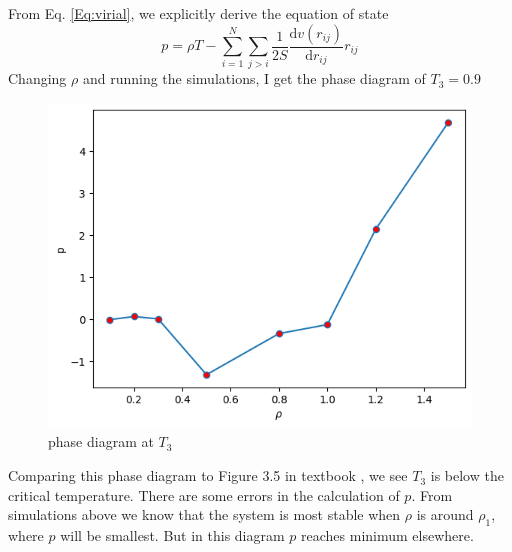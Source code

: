 \documentclass[letterpaper,12pt]{article}
\numberwithin{equation}{section}
\begin{document}
From Eq. \ref{Eq:virial}, we explicitly derive the equation of state
\begin{equation}
    p=\rho T-\sum\limits_{i=1}^N{\sum\limits_{j>i}{\frac{1}{2S}\frac{\mathrm{d}v(r_{ij})}{\mathrm{d}r_{ij}}{r}_{ij}}}
\end{equation}
Changing $\rho$ and running the simulations, I get the phase diagram of $T_3=0.9$
\begin{figure}[H]
    \centering
    \includegraphics{Project/phase_diagram1.png}
    \caption{phase diagram at $T_3$}
    \label{fig:phase_diagram1}
\end{figure}
Comparing this phase diagram to Figure 3.5 in textbook \cite{UMS}, we see $T_3$ is below the critical temperature. There are some errors in the calculation of $p$. From simulations above we know that the system is most stable when $\rho$ is around $\rho_1$, where $p$ will be smallest. But in this diagram $p$ reaches minimum elsewhere. 
\end{document}
